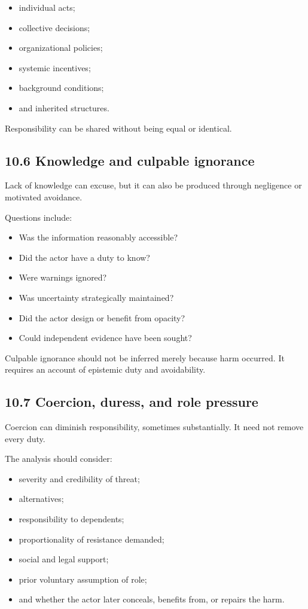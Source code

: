 \documentclass[
  11pt,
]{article}
\providecommand{\tightlist}{%
  \setlength{\itemsep}{0pt}\setlength{\parskip}{0pt}}
\begin{document}
\begin{itemize}
\tightlist
\item
  individual acts;
\item
  collective decisions;
\item
  organizational policies;
\item
  systemic incentives;
\item
  background conditions;
\item
  and inherited structures.
\end{itemize}

Responsibility can be shared without being equal or identical.

\subsection{10.6 Knowledge and culpable
ignorance}\label{knowledge-and-culpable-ignorance}

Lack of knowledge can excuse, but it can also be produced through
negligence or motivated avoidance.

Questions include:

\begin{itemize}
\tightlist
\item
  Was the information reasonably accessible?
\item
  Did the actor have a duty to know?
\item
  Were warnings ignored?
\item
  Was uncertainty strategically maintained?
\item
  Did the actor design or benefit from opacity?
\item
  Could independent evidence have been sought?
\end{itemize}

Culpable ignorance should not be inferred merely because harm occurred.
It requires an account of epistemic duty and avoidability.

\subsection{10.7 Coercion, duress, and role
pressure}\label{coercion-duress-and-role-pressure}

Coercion can diminish responsibility, sometimes substantially. It need
not remove every duty.

The analysis should consider:

\begin{itemize}
\tightlist
\item
  severity and credibility of threat;
\item
  alternatives;
\item
  responsibility to dependents;
\item
  proportionality of resistance demanded;
\item
  social and legal support;
\item
  prior voluntary assumption of role;
\item
  and whether the actor later conceals, benefits from, or repairs the
  harm.
\end{itemize}
\end{document}
